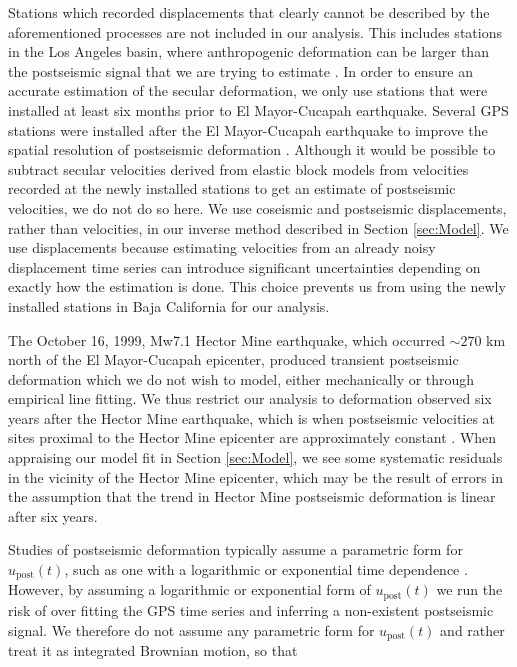 \documentclass[draft,linenumbers]{AGUJournal}
\begin{document}
Stations which recorded displacements that clearly cannot be described by the aforementioned processes are not included in our analysis. This includes stations in the Los Angeles basin, where anthropogenic deformation can be larger than the postseismic signal that we are trying to estimate \citep{Bawden2001,Argus2005}. In order to ensure an accurate estimation of the secular deformation, we only use stations that were installed at least six months prior to El Mayor-Cucapah earthquake. Several GPS stations were installed after the El Mayor-Cucapah earthquake to improve the spatial resolution of postseismic deformation \citep{Spinler2015}.  Although it would be possible to subtract secular velocities derived from elastic block models \citep[e.g.][]{Meade2005} from velocities recorded at the newly installed stations to get an estimate of postseismic velocities, we do not do so here.  We use coseismic and postseismic displacements, rather than velocities, in our inverse method described in Section \ref{sec:Model}. We use displacements because estimating velocities from an already noisy displacement time series can introduce significant uncertainties depending on exactly how the estimation is done.  This choice prevents us from using the newly installed stations in Baja California for our analysis.   

The October 16, 1999, Mw7.1 Hector Mine earthquake, which occurred ${\sim}270$ km north of the El Mayor-Cucapah epicenter, produced transient postseismic deformation which we do not wish to model, either mechanically or through empirical line fitting.  We thus restrict our analysis to deformation observed six years after the Hector Mine earthquake, which is when postseismic velocities at sites proximal to the Hector Mine epicenter are approximately constant \citep{Savage2009}. When appraising our model fit in Section \ref{sec:Model}, we see some systematic residuals in the vicinity of the Hector Mine epicenter, which may be the result of errors in the assumption that the trend in Hector Mine postseismic deformation is linear after six years.   

Studies of postseismic deformation typically assume a parametric form for $u_\mathrm{post}(t)$, such as one with a logarithmic or exponential time dependence \citep[e.g.][]{Savage2005a}.  However, by assuming a logarithmic or exponential form of $u_\mathrm{post}(t)$ we run the risk of over fitting the GPS time series and inferring a non-existent postseismic signal. We therefore do not assume any parametric form for $u_\mathrm{post}(t)$ and rather treat it as integrated Brownian motion, so that 
\end{document}
